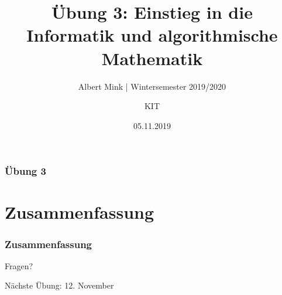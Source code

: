\documentclass[c,18pt]{beamer}
\date{05.11.2019}
\title{Übung 3: Einstieg in die Informatik und algorithmische Mathematik}
\subtitle{Albert Mink | Wintersemester 2019/2020}
\author[Albert Mink, ]{KIT}
\institute[Institut für Angewandte und Numerische Mathematik (IANM)]{Institut für Angewandte und Numerische Mathematik}
\begin{document}
\begin{frame}
  \maketitle
\end{frame}


\begin{frame}
  \frametitle{Übung 3}%
\tableofcontents
\end{frame}



\def\kap{1}

\setcounter{exercise}{7}

\setcounter{exercise}{8}
\setcounter{exercise}{9}
\setcounter{exercise}{10}

\def\kap{2}



\section{Zusammenfassung}
\begin{frame}
  \frametitle{Zusammenfassung}%
\tableofcontents[hideallsubsections]
\end{frame}

\begin{frame}
\centering
\Huge\textcolor{KITgreen}{Fragen?}
\vspace{2cm}

{\LARGE
Nächste Übung: 12. November
}
\end{frame}


\end{document}
